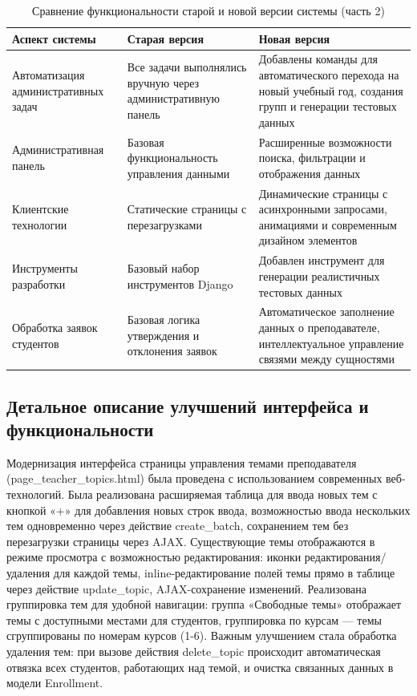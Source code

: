 \documentclass[a4paper,12pt]{article}
\begin{document}
\begin{table}[H]
\centering
\caption{Сравнение функциональности старой и новой версии системы (часть 2)}
\begin{small}
\begin{tabular}{|p{}|p{}|p{}|}
\hline
\textbf{Аспект системы} & \textbf{Старая версия} & \textbf{Новая версия} \\
\hline
\hline
Автоматизация административных задач & Все задачи выполнялись вручную через административную панель & Добавлены команды для автоматического перехода на новый учебный год, создания групп и генерации тестовых данных \\
\hline
Административная панель & Базовая функциональность управления данными & Расширенные возможности поиска, фильтрации и отображения данных \\
\hline
Клиентские технологии & Статические страницы с перезагрузками & Динамические страницы с асинхронными запросами, анимациями и современным дизайном элементов \\
\hline
Инструменты разработки & Базовый набор инструментов Django & Добавлен инструмент для генерации реалистичных тестовых данных \\
\hline
Обработка заявок студентов & Базовая логика утверждения и отклонения заявок & Автоматическое заполнение данных о преподавателе, интеллектуальное управление связями между сущностями \\
\hline
\end{tabular}
\end{small}
\label{tab:interface_comparison_2}
\end{table}
\subsection{Детальное описание улучшений интерфейса и функциональности}

Модернизация интерфейса страницы управления темами преподавателя (page\_teacher\_topics.html) была проведена с использованием современных веб-технологий. Была реализована расширяемая таблица для ввода новых тем с кнопкой «+» для добавления новых строк ввода, возможностью ввода нескольких тем одновременно через действие create\_batch, сохранением тем без перезагрузки страницы через AJAX. Существующие темы отображаются в режиме просмотра с возможностью редактирования: иконки редактирования/удаления для каждой темы, inline-редактирование полей темы прямо в таблице через действие update\_topic, AJAX-сохранение изменений. Реализована группировка тем для удобной навигации: группа «Свободные темы» отображает темы с доступными местами для студентов, группировка по курсам — темы сгруппированы по номерам курсов (1-6). Важным улучшением стала обработка удаления тем: при вызове действия delete\_topic происходит автоматическая отвязка всех студентов, работающих над темой, и очистка связанных данных в модели Enrollment.
\end{document}
